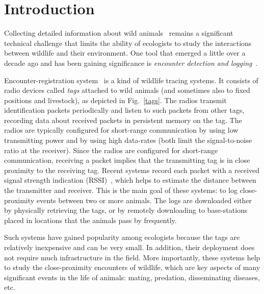 \section{Introduction}

Collecting detailed information about wild animals~\cite{Prangle2006NewRadiocolars,Rutz2012AutomatedMapping} 
remains a significant technical challenge that
limits the ability of ecologists to study the interactions between wildlife and their environment. 
One tool that emerged a little over a decade ago
and has been gaining significance is 
{\em encounter detection and logging}~\cite{Tentelier2016FishNetwork,
Bohm2009WildlifeLivestock,Ripperger2016ProximitySensing}.

Encounter-registration system~\cite{Levin2015Performance,Menhill2012NovelTelemetry,dressler2016bats} 
is a kind of wildlife tracing systems.
It consists of radio devices called {\em tags} attached to wild
animals (and sometimes also to fixed positions and livestock), as depicted in Fig.~\ref{tags}. 
The radios transmit identification
packets periodically and listen to such packets from other tags,
recording data about received packets in persistent memory on the tag. The
radios are typically configured for short-range communication by using low transmitting power and by 
using high data-rates (both limit the signal-to-noise ratio at the receiver). Since the radios
are configured for short-range communication, receiving a packet implies that the transmitting tag is
in close proximity to the receiving tag. Recent systems record each packet with a received signal strength
indication (RSSI)~\cite{Daiya2011Experimental}, which helps to estimate the distance between the transmitter and receiver.
This is the main goal of these systems: to log close-proximity
events between two or more animals. The logs are downloaded either by physically retrieving the tags,
or by remotely downloading to base-stations placed in locations that the animals pass by frequently.

Such systems have gained popularity among ecologists because 
the tags are relatively inexpensive and can
be very small. In addition, their deployment does not require much infrastructure in the field.
More importantly, these systems help to study the close-proximity encounters of wildlife, 
which are key aspects of many significant 
events in the life of animals: mating, predation, disseminating diseases, etc.


